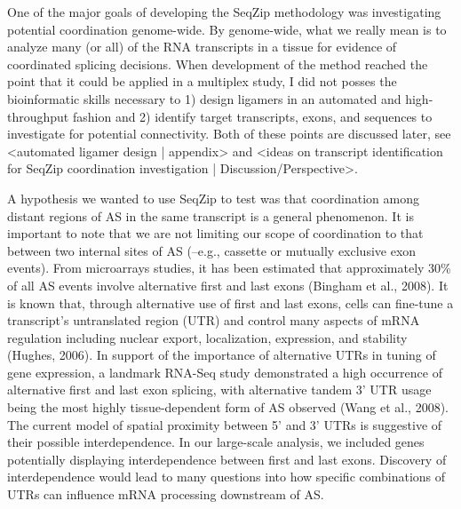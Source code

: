 One of the major goals of developing the SeqZip methodology was investigating potential coordination genome-wide. By genome-wide, what we really mean is to analyze many (or all) of the RNA transcripts in a tissue for evidence of coordinated splicing decisions. When development of the method reached the point that it could be applied in a multiplex study, I did not posses the bioinformatic skills necessary to 1) design ligamers in an automated and high-throughput fashion and 2) identify target transcripts, exons, and sequences to investigate for potential connectivity. Both of these points are discussed later, see <automated ligamer design | appendix> and <ideas on transcript identification for SeqZip coordination investigation | Discussion/Perspective>.

A hypothesis we wanted to use SeqZip to test was that coordination among distant regions of AS in the same transcript is a general phenomenon. It is important to note that we are not limiting our scope of coordination to that between two internal sites of AS (–e.g., cassette or mutually exclusive exon events). From microarrays studies, it has been estimated that approximately 30\% of all AS events involve alternative first and last exons (Bingham et al., 2008).  It is known that, through alternative use of first and last exons, cells can fine-tune a transcript’s untranslated region (UTR) and control many aspects of mRNA regulation including nuclear export, localization, expression, and stability (Hughes, 2006).  In support of the importance of alternative UTRs in tuning of gene expression, a landmark RNA-Seq study demonstrated a high occurrence of alternative first and last exon splicing, with alternative tandem 3’ UTR usage being the most highly tissue-dependent form of AS observed (Wang et al., 2008).  The current model of spatial proximity between 5’ and 3’ UTRs is suggestive of their possible interdependence. In our large-scale analysis, we included genes potentially displaying interdependence between first and last exons. Discovery of interdependence would lead to many questions into how specific combinations of UTRs can influence mRNA processing downstream of AS.


